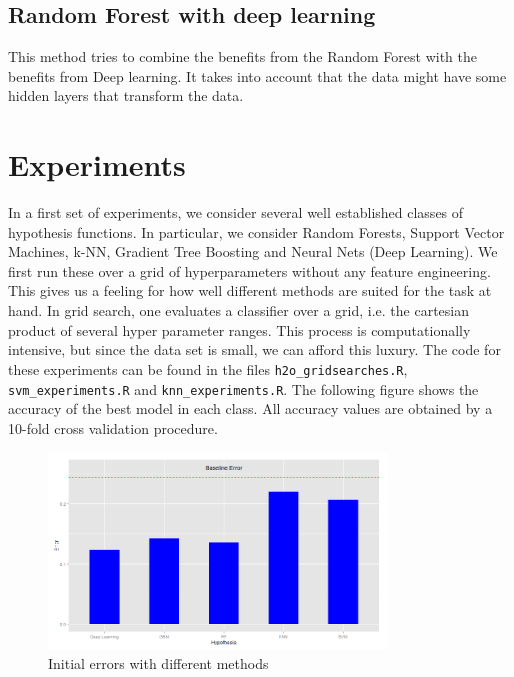 \documentclass[paper=a4, fontsize=11pt]{scrartcl}
\numberwithin{equation}{section}
\numberwithin{figure}{section}
\numberwithin{table}{section}
\begin{document}
\subsection{Random Forest with deep learning}
This  method tries to combine the benefits from the Random Forest with the benefits from Deep learning. It takes into account that the data might have some hidden layers that transform the data. 









\section{Experiments}
In a first set of experiments, we consider several well established classes of hypothesis functions. In particular, we consider Random Forests, Support Vector Machines, k-NN,  Gradient Tree Boosting and Neural Nets (Deep Learning). 
We first run these over a grid of hyperparameters without any feature engineering. This gives us a feeling for how well different methods are suited for the task at hand. In grid search, one evaluates a classifier over a grid, i.e. the cartesian product of several hyper parameter ranges. This process is computationally intensive, but since the data set is small, we can afford this luxury. The code for these experiments can be found in the files \lstinline{h2o_gridsearches.R}, \lstinline{svm_experiments.R} and \lstinline{knn_experiments.R}. The following figure shows the accuracy of the best model in each class. All accuracy values are obtained by a 10-fold cross validation procedure. 

\begin{figure}[p]
    \centering
    \includegraphics[width=0.8\textwidth]{erorrs.png}
    \caption{Initial errors with different methods}
    \label{fig:errors}
\end{figure}
\end{document}
